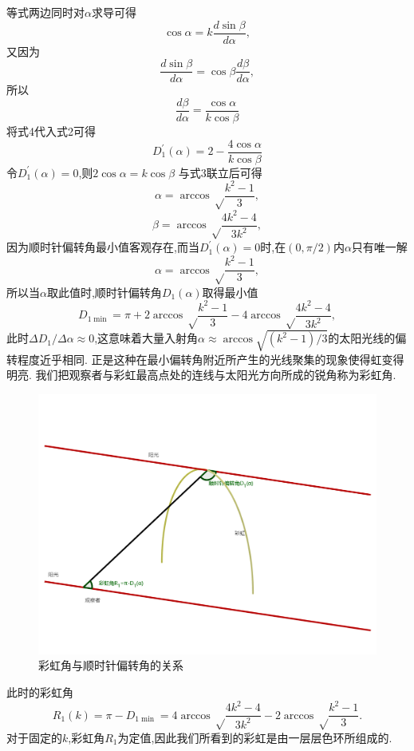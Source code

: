 \documentclass[a4paper]{article}%
\begin{document}
等式两边同时对$\alpha$求导可得
\[\cos\alpha=k\frac{d\sin\beta}{d\alpha},\]
又因为
\[\frac{d\sin\beta}{d\alpha}=\cos\beta\frac{d\beta}{d\alpha},\]
所以
\begin{equation*}
\frac{d\beta}{d\alpha}=\frac{\cos\alpha}{k\cos\beta}\tag{式4}
\end{equation*}
将式4代入式2可得
\begin{equation*}
D_1^{\prime}(\alpha)=2-\frac{4\cos\alpha}{k\cos\beta}\tag{式5}
\end{equation*}
令$D_1^{\prime}(\alpha)=0$,则$2\cos\alpha=k\cos\beta$
与式3联立后可得
\[\alpha=\arccos\sqrt\frac{k^2-1}{3},\]
\[\beta=\arccos\sqrt\frac{4k^2-4}{3k^2},\]
因为顺时针偏转角最小值客观存在,而当$D_1^{\prime}(\alpha)=0$时,在$(0,\pi/2)$内$\alpha$只有唯一解
\[\alpha=\arccos\sqrt\frac{k^2-1}{3},\]
所以当$\alpha$取此值时,顺时针偏转角$D_1(\alpha)$取得最小值
\[D_{1\min}=\pi+2\arccos\sqrt\frac{k^2-1}{3}-4\arccos\sqrt\frac{4k^2-4}{3k^2},\]
此时$\Delta D_1/\Delta\alpha\approx 0$,这意味着大量入射角$\alpha\approx \arccos\sqrt {(k^2-1)/3}$的太阳光线的偏转程度近乎相同.
正是这种在最小偏转角附近所产生的光线聚集的现象使得虹变得明亮.
我们把观察者与彩虹最高点处的连线与太阳光方向所成的锐角称为彩虹角.
\begin{figure}[ht]
   \centering
   \includegraphics[scale=0.14]{图2}
   \caption[图2]{彩虹角与顺时针偏转角的关系}\label{fig-图2}
   \end{figure}


此时的彩虹角
\[R_1(k)=\pi-D_{1\min}=4\arccos\sqrt\frac{4k^2-4}{3k^2}-2\arccos\sqrt\frac{k^2-1}{3}.\]
对于固定的$k$,彩虹角$R_1$为定值,因此我们所看到的彩虹是由一层层色环所组成的.
\end{document}
